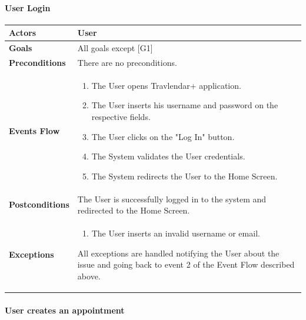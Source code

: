 \documentclass[12pt]{article}
\begin{document}
\newpage

\paragraph{User Login}
\begin{center}
    \begin{tabular} { |p{}|p{}| }
        \hline
        \textbf{Actors} & User \\ 
        \hline
        \textbf{Goals} & All goals except {[G1]} \\ 
        \hline  
        \textbf{Preconditions} & There are no preconditions. \\ 
        \hline
        \textbf{Events Flow} & \begin{enumerate}[topsep=0pt] 
                            \setlength{\itemsep}{0.5pt}
                            \item The User opens Travlendar+ application.
                            \item The User inserts his username and password on the respective fields.
                            \item The User clicks on the "Log In" button.
                            \item The System validates the User credentials.
                            \item The System redirects the User to the Home Screen.
                            \end{enumerate} \\
        \hline
        \textbf{Postconditions} & The User is successfully logged in to the system and redirected to the Home Screen. \\
        \hline
        \textbf{Exceptions} & \begin{enumerate}[topsep=0pt] 
                            \setlength{\itemsep}{0.5pt}
                            \item The User inserts an invalid username or email.
                            \end{enumerate} 
                            All exceptions are handled notifying the User about the issue and going back to event 2 of the Event Flow described above.\\ 
        \hline
    \end{tabular}
\end{center}

\newpage

\paragraph{User creates an appointment}
\end{document}
